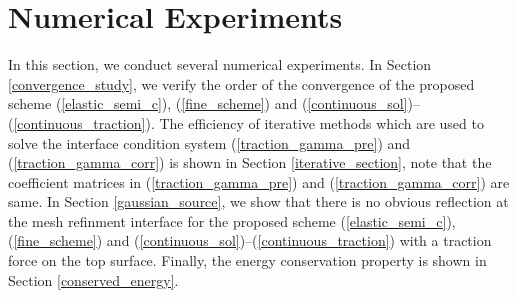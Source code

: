 \section{Numerical Experiments}
In this section, we conduct several numerical experiments. In Section \ref{convergence_study}, we verify the order of the convergence of the proposed scheme (\ref{elastic_semi_c}), (\ref{fine_scheme}) and (\ref{continuous_sol})--(\ref{continuous_traction}). The efficiency of iterative methods which are used to solve the interface condition system (\ref{traction_gamma_pre}) and (\ref{traction_gamma_corr}) is shown in Section \ref{iterative_section}, note that the coefficient matrices in (\ref{traction_gamma_pre}) and (\ref{traction_gamma_corr}) are same. In Section \ref{gaussian_source}, we show that there is no obvious reflection at the mesh refinment interface for the proposed scheme (\ref{elastic_semi_c}), (\ref{fine_scheme}) and (\ref{continuous_sol})--(\ref{continuous_traction}) with a traction force on the top surface. Finally, the energy conservation property is shown in Section \ref{conserved_energy}.